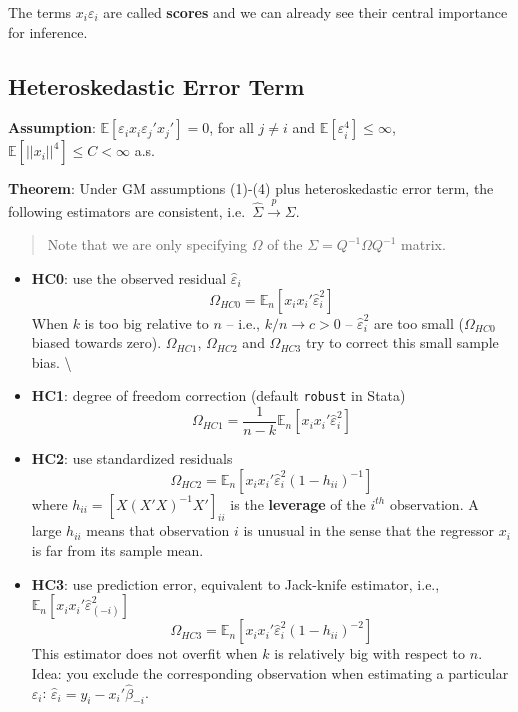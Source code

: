 \documentclass[12pt,]{book}
\providecommand{\tightlist}{%
  \setlength{\itemsep}{0pt}\setlength{\parskip}{0pt}}
\begin{document}
The terms \(x_i \varepsilon_i\) are called \textbf{scores} and we can already see their central importance for inference.

\hypertarget{heteroskedastic-error-term}{%
\subsection{Heteroskedastic Error Term}\label{heteroskedastic-error-term}}

\textbf{Assumption}:
\(\mathbb E [\varepsilon_i x_i \varepsilon_j' x_j'] = 0\), for all \(j \ne i\) and \(\mathbb E [\varepsilon_i^4] \leq \infty\), \(\mathbb E [|| x_i||^4] \leq C < \infty\) a.s.

\textbf{Theorem}:
Under GM assumptions (1)-(4) plus heteroskedastic error term, the following estimators are consistent, i.e.~\(\hat{\Sigma}\xrightarrow{p} \Sigma\).

\begin{quote}
Note that we are only specifying \(\Omega\) of the \(\Sigma = Q^{-1} \Omega Q^{-1}\) matrix.
\end{quote}

\begin{itemize}
\tightlist
\item
  \textbf{HC0}: use the observed residual \(\hat{\varepsilon}_i\)
  \[
        \Omega _ {HC0} = \mathbb E_n [x_i x_i' \hat{\varepsilon}_i^2]
    \]
  When \(k\) is too big relative to \(n\) -- i.e., \(k/n \rightarrow c >0\) -- \(\hat{\varepsilon}_i^2\) are too small (\(\Omega _ {HC0}\) biased towards zero). \(\Omega _ {HC1}\), \(\Omega _ {HC2}\) and \(\Omega _ {HC3}\) try to correct this small sample bias. \textbackslash{}
\item
  \textbf{HC1}: degree of freedom correction (default \texttt{robust} in Stata)
  \[
        \Omega _ {HC1} = \frac{1}{n - k }\mathbb E_n [x_i x_i' \hat{\varepsilon}_i^2] 
    \]
\item
  \textbf{HC2}: use standardized residuals
  \[
        \Omega _ {HC2} = \mathbb E_n [x_i x_i' \hat{\varepsilon}_i^2 (1-h _ {ii})^{-1}]
    \]
  where \(h _ {ii} = [X(X'X)^{-1} X'] _ {ii}\) is the \textbf{leverage} of the \(i^{th}\) observation. A large \(h _ {ii}\) means that observation \(i\) is unusual in the sense that the regressor \(x_i\) is far from its sample mean.
\item
  \textbf{HC3}: use prediction error, equivalent to Jack-knife estimator, i.e., \(\mathbb E_n [x_i x_i' \hat{\varepsilon} _ {(-i)}^2]\)
  \[
        \Omega _ {HC3} = \mathbb E_n [x_i x_i' \hat{\varepsilon}_i^2 (1-h _ {ii})^{-2}]
    \]
  This estimator does not overfit when \(k\) is relatively big with respect to \(n\). Idea: you exclude the corresponding observation when estimating a particular \(\varepsilon_i\): \(\hat{\varepsilon}_i = y_i - x_i' \hat \beta _ {-i}\).
\end{itemize}
\end{document}
